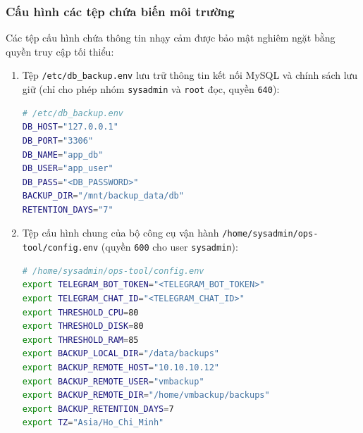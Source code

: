\documentclass[a4paper,12pt]{article}
\begin{document}
\subsubsection{Cấu hình các tệp chứa biến môi trường}
Các tệp cấu hình chứa thông tin nhạy cảm được bảo mật nghiêm ngặt bằng quyền truy cập tối thiểu:
\begin{enumerate}
    \item Tệp \texttt{/etc/db\_backup.env} lưu trữ thông tin kết nối MySQL và chính sách lưu giữ (chỉ cho phép nhóm \texttt{sysadmin} và \texttt{root} đọc, quyền \texttt{640}):
    \begin{lstlisting}[language=bash]
# /etc/db_backup.env
DB_HOST="127.0.0.1"
DB_PORT="3306"
DB_NAME="app_db"
DB_USER="app_user"
DB_PASS="<DB_PASSWORD>"
BACKUP_DIR="/mnt/backup_data/db"
RETENTION_DAYS="7"
    \end{lstlisting}

    \item Tệp cấu hình chung của bộ công cụ vận hành \texttt{/home/sysadmin/ops-tool/config.env} (quyền \texttt{600} cho user \texttt{sysadmin}):
    \begin{lstlisting}[language=bash]
# /home/sysadmin/ops-tool/config.env
export TELEGRAM_BOT_TOKEN="<TELEGRAM_BOT_TOKEN>"
export TELEGRAM_CHAT_ID="<TELEGRAM_CHAT_ID>"
export THRESHOLD_CPU=80
export THRESHOLD_DISK=80
export THRESHOLD_RAM=85
export BACKUP_LOCAL_DIR="/data/backups"
export BACKUP_REMOTE_HOST="10.10.10.12"
export BACKUP_REMOTE_USER="vmbackup"
export BACKUP_REMOTE_DIR="/home/vmbackup/backups"
export BACKUP_RETENTION_DAYS=7
export TZ="Asia/Ho_Chi_Minh"
    \end{lstlisting}
\end{enumerate}
\end{document}
